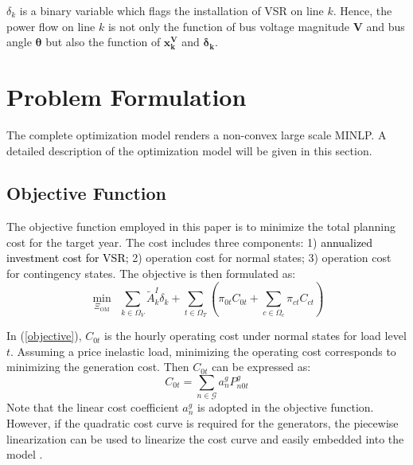 \documentclass[journal]{IEEEtran}
\begin{document}
$\delta_k$ is a binary variable which flags the installation of  VSR on line $k$. Hence, the power flow on line $k$ is not only the function of bus voltage magnitude $\bm{V}$ and bus angle $\bm{\theta}$ but also the function of $\bm{x_k^{V}}$ and $\bm{\delta_k}$.

\section{Problem Formulation}
\label{problem_formulation}
The complete optimization model renders a non-convex large scale MINLP. A detailed description of the optimization model will be given in this section.
\subsection{Objective Function}
The objective function employed in this paper is to minimize the total planning cost for the target year. The cost includes three components: 1) \textcolor{black}{annualized investment cost for VSR;} 2) operation cost for normal states; 3) operation cost for contingency states. The objective is then formulated as:
\begin{equation}
	\min_{\Xi_{\text{OM}}} \ \ \sum_{k\in \Omega_V}\tilde{A}_k^I\delta_k+\sum_{t\in \Omega_T}(\pi_{0t}C_{0t}+\sum_{c\in \Omega_c}\pi_{ct}C_{ct}) \label{objective}
\end{equation}  

In (\ref{objective}), $C_{0t}$ is the hourly operating cost under normal states for load level $t$. Assuming a price inelastic load, minimizing the operating cost corresponds to minimizing the generation cost. Then $C_{0t}$ can be expressed as:
\begin{equation}
	C_{0t}=\sum_{n\in \mathcal{G}}a_{n}^gP^g_{n0t}  \label{obj_base}
\end{equation}     
Note that the linear cost coefficient $a_n^g$ is adopted in the objective function. However, if the quadratic cost curve is required for the generators, the piecewise linearization can be used to linearize the cost curve and easily embedded into the model \cite{mybibb:guodong_xiaohu1}.
\end{document}
